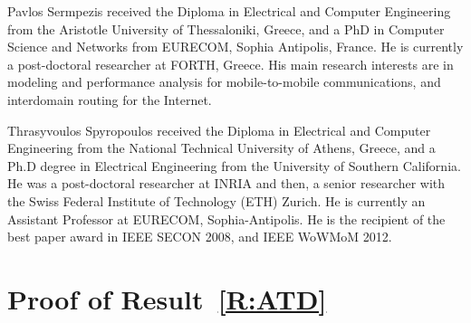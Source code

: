 \documentclass[journal]{IEEEtran}
\begin{document}
\begin{IEEEbiography}{Pavlos Sermpezis}
received the Diploma in Electrical and Computer Engineering from the Aristotle University of Thessaloniki, Greece, and a PhD in Computer Science and Networks from EURECOM, Sophia Antipolis, France. He is currently a post-doctoral researcher at FORTH, Greece. His main research interests are in modeling and performance analysis for mobile-to-mobile communications, and interdomain routing for the Internet.
\end{IEEEbiography}
\begin{IEEEbiography}{Thrasyvoulos Spyropoulos}
received the Diploma in Electrical and Computer Engineering from the National Technical University of Athens, Greece, and a Ph.D degree in Electrical Engineering from the University of Southern California. He was a post-doctoral researcher at INRIA and then, a senior researcher with the Swiss Federal Institute of Technology (ETH) Zurich. He is currently an Assistant Professor at EURECOM, Sophia-Antipolis. He is the recipient of the best paper award in IEEE SECON 2008, and IEEE WoWMoM 2012.
\end{IEEEbiography} 
\vfill



\appendices
\section{Proof of Result~\ref{R:ATD}}\label{appendix:proof-R:ATD}
\end{document}
